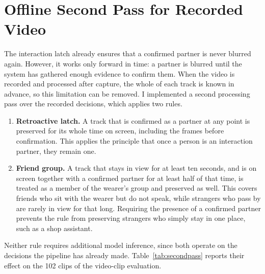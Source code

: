 \section{Offline Second Pass for Recorded Video}
\label{sec:results_secondpass}

The interaction latch already ensures that a confirmed partner is never blurred
again. However, it works only forward in time: a partner is blurred until the
system has gathered enough evidence to confirm them. When the video is recorded and
processed after capture, the whole of each track is known in advance, so this
limitation can be removed. I implemented a second processing pass over the recorded
decisions, which applies two rules.

\begin{enumerate}
  \item \textbf{Retroactive latch.} A track that is confirmed as a partner at any
        point is preserved for its whole time on screen, including the frames before
        confirmation. This applies the principle that once a person is an interaction
        partner, they remain one.
  \item \textbf{Friend group.} A track that stays in view for at least ten seconds,
        and is on screen together with a confirmed partner for at least half of that
        time, is treated as a member of the wearer's group and preserved as well.
        This covers friends who sit with the wearer but do not speak, while strangers
        who pass by are rarely in view for that long. Requiring the presence of a
        confirmed partner prevents the rule from preserving strangers who simply stay
        in one place, such as a shop assistant.
\end{enumerate}

Neither rule requires additional model inference, since both operate on the
decisions the pipeline has already made. Table~\ref{tab:secondpass} reports their
effect on the 102 clips of the video-clip evaluation.

\begin{table}[htbp]
\begin{singlespace}
\centering
\caption{Effect of the offline second pass on the video-clip evaluation (102 clips,
95\% Wilson confidence intervals).}
\label{tab:secondpass}
\renewcommand{\arraystretch}{1.3}
\end{singlespace}
\end{table}

